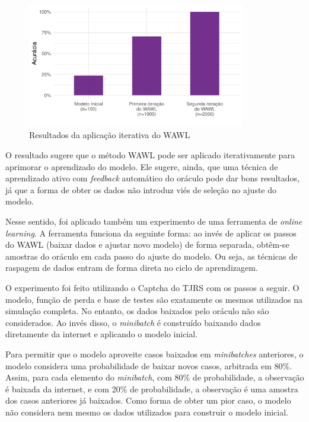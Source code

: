 \documentclass[12pt,twoside,brazilian]{book}
\begin{document}
\begin{figure}

{\centering \includegraphics[width=0.85\textwidth,height=\textheight]{./resultados_files/figure-pdf/fig-aplicacao-iterada-1.pdf}

}

\caption{\label{fig-aplicacao-iterada}Resultados da aplicação iterativa
do WAWL}

\end{figure}

O resultado sugere que o método WAWL pode ser aplicado iterativamente
para aprimorar o aprendizado do modelo. Ele sugere, ainda, que uma
técnica de aprendizado ativo com \emph{feedback} automático do oráculo
pode dar bons resultados, já que a forma de obter os dados não introduz
viés de seleção no ajuste do modelo.

Nesse sentido, foi aplicado também um experimento de uma ferramenta de
\emph{online learning}. A ferramenta funciona da seguinte forma: ao
invés de aplicar os passos do WAWL (baixar dados e ajustar novo modelo)
de forma separada, obtêm-se amostras do oráculo em cada passo do ajuste
do modelo. Ou seja, as técnicas de raspagem de dados entram de forma
direta no ciclo de aprendizagem.

O experimento foi feito utilizando o Captcha do TJRS com os passos a
seguir. O modelo, função de perda e base de testes são exatamente os
mesmos utilizados na simulação completa. No entanto, os dados baixados
pelo oráculo não são considerados. Ao invés disso, o \emph{minibatch} é
construído baixando dados diretamente da internet e aplicando o modelo
inicial.

Para permitir que o modelo aproveite casos baixados em
\emph{minibatches} anteriores, o modelo considera uma probabilidade de
baixar novos casos, arbitrada em 80\%. Assim, para cada elemento do
\emph{minibatch}, com 80\% de probabilidade, a observação é baixada da
internet, e com 20\% de probabilidade, a observação é uma amostra dos
casos anteriores já baixados. Como forma de obter um pior caso, o modelo
não considera nem mesmo os dados utilizados para construir o modelo
inicial.
\end{document}
